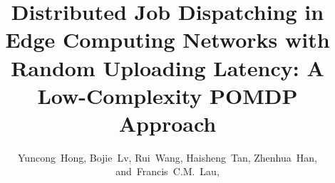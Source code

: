 \documentclass[10pt,journal,compsoc]{IEEEtran} %
\theoremstyle{definition}             %
\theoremstyle{remark}                 %
\theoremstyle{plain}                  %
\begin{document}
    \title{Distributed Job Dispatching in Edge Computing Networks with Random Uploading Latency: A Low-Complexity POMDP Approach
    }

    \author{
        Yuncong~Hong,%
        Bojie~Lv,%
        Rui~Wang,%
        Haisheng~Tan,%
        Zhenhua~Han,%
        and~Francis~C.M.~Lau,%
    }%


    
    \maketitle
    
    

    
    

    
    
    

    

    \ifCLASSOPTIONcaptionsoff
        \newpage
    \fi

    
    

    
\end{document}
